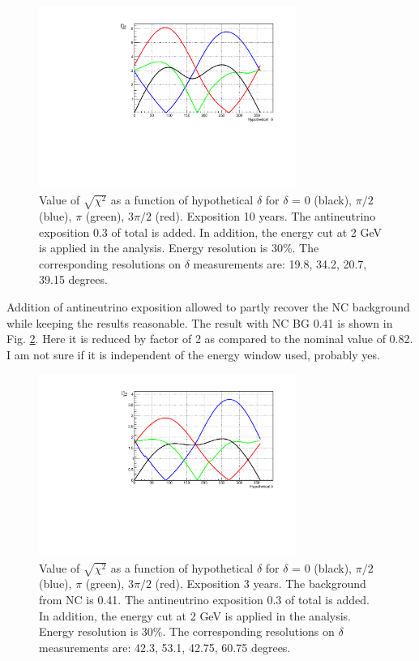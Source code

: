 \documentclass[prd,showpacs,groupedaddress,superscriptaddress,amsmath,amssymb]{revtex4-2} %
\begin{document}
\begin{figure}[h]
\begin{center}
\includegraphics[width=0.75\textwidth]{del_anu10.pdf}
\caption {Value of $\sqrt{\chi^2}$ as a function of hypothetical $\delta$ for $\delta$ = 0 (black), $\pi/2$ (blue), $\pi$ (green), $3\pi/2$ (red).
          Exposition 10 years.
          The antineutrino exposition 0.3 of total is added. In addition, the energy cut at 2 GeV is applied in the analysis. Energy resolution is 30\%.
          The corresponding resolutions on $\delta$ measurements are: 19.8, 34.2, 20.7, 39.15 degrees.
\label{fig:del_anu10}}
\end{center}
\end{figure}

 Addition of antineutrino exposition allowed to partly recover the NC background while keeping the results reasonable. The result with NC BG 0.41
is shown in Fig. \ref{fig:del_anuNC04}. Here it is reduced by factor of 2 as compared to the nominal value of 0.82. I am not sure if it is
independent of the energy window used, probably yes.

\begin{figure}[h]
\begin{center}
\includegraphics[width=0.75\textwidth]{del_anuNC04.pdf}
\caption {Value of $\sqrt{\chi^2}$ as a function of hypothetical $\delta$ for $\delta$ = 0 (black), $\pi/2$ (blue), $\pi$ (green), $3\pi/2$ (red).
          Exposition 3 years. The background from NC is 0.41.
          The antineutrino exposition 0.3 of total is added. In addition, the energy cut at 2 GeV is applied in the analysis. Energy resolution is 30\%.
          The corresponding resolutions on $\delta$ measurements are: 42.3, 53.1, 42.75, 60.75 degrees.
\label{fig:del_anuNC04}}
\end{center}
\end{figure}
\end{document}
